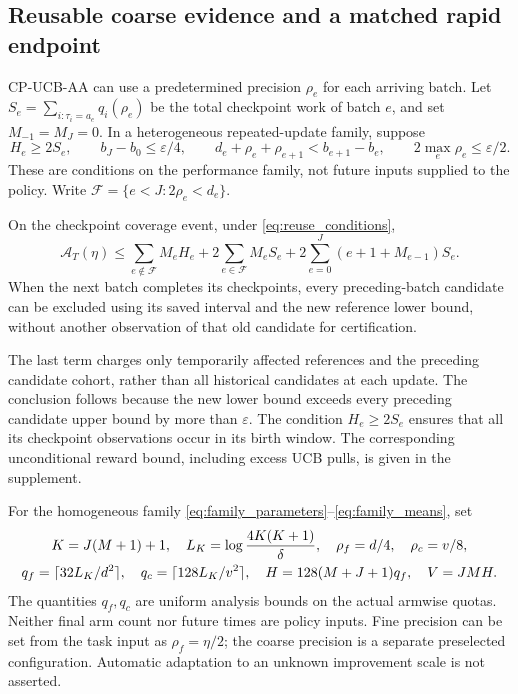 \documentclass[11pt]{article}
\begin{document}
\subsection{Reusable coarse evidence and a matched rapid endpoint}

CP-UCB-AA can use a predetermined precision $\rho_e$ for each arriving batch.
Let $S_e=\sum_{i:\tau_i=a_e}q_i(\rho_e)$ be the total checkpoint work of
batch $e$, and set $M_{-1}=M_J=0$. In a heterogeneous repeated-update family,
suppose
\begin{equation}
 H_e\ge2S_e,\qquad b_J-b_0\le\varepsilon/4,\qquad
 d_e+\rho_e+\rho_{e+1}<b_{e+1}-b_e,\qquad
 2\max_e\rho_e\le\varepsilon/2.
 \label{eq:reuse_conditions}
\end{equation}
These are conditions on the performance family, not future inputs supplied to
the policy. Write $\mathcal F=\{e<J:2\rho_e<d_e\}$.

\begin{proposition}
\label{thm:reuse}
On the checkpoint coverage event, under \eqref{eq:reuse_conditions},
\begin{equation}
 \mathcal A_T(\eta)\le
 \sum_{e\notin\mathcal F}M_eH_e+
 2\sum_{e\in\mathcal F}M_eS_e+
 2\sum_{e=0}^J(e+1+M_{e-1})S_e.
 \label{eq:reuse_area}
\end{equation}
When the next batch completes its checkpoints, every preceding-batch candidate
can be excluded using its saved interval and the new reference lower bound,
without another observation of that old candidate for certification.
\end{proposition}

The last term charges only temporarily affected references and the preceding
candidate cohort, rather than all historical candidates at each update.
The conclusion follows because the new lower bound exceeds every preceding
candidate upper bound by more than $\varepsilon$. The condition
$H_e\ge2S_e$ ensures that all its checkpoint observations occur in its birth
window. The corresponding unconditional reward bound, including excess UCB
pulls, is given in the supplement.

For the homogeneous family \eqref{eq:family_parameters}--\eqref{eq:family_means},
set
\begin{gather}
 K=J(M+1)+1,\quad L_K=\log\frac{4K(K+1)}\delta,\quad
 \rho_f=d/4,\quad\rho_c=v/8,\notag\\
 q_f=\lceil32L_K/d^2\rceil,\quad q_c=\lceil128L_K/v^2\rceil,\quad
 H=128(M+J+1)q_f,\quad V=JMH.
 \label{eq:chosen_horizon}
\end{gather}
The quantities $q_f,q_c$ are uniform analysis bounds on the actual armwise
quotas. Neither final arm count nor future times are policy inputs. Fine
precision can be set from the task input as $\rho_f=\eta/2$; the coarse
precision is a separate preselected configuration. Automatic adaptation to
an unknown improvement scale is not asserted.
\end{document}
